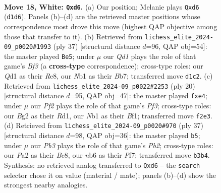 \documentclass[11pt]{article}
\begin{document}
\clearpage

\begin{figure}[p]\centering
\begin{subfigure}{0.46\textwidth}\centering
\resizebox{\linewidth}{!}{%
\newchessgame
\chessboard[
  setfen={rnbr2k1/1p2bpp1/pn1qp3/7p/8/1Pp1p1P1/P3PPBP/RNBQRK2 w - - 0 18},
  showmover=false,
  pgfstyle=straightmove, color=movearrow, markmove={d1-d6}
]}
\caption{}
\end{subfigure}\hfill
\begin{subfigure}{0.46\textwidth}\centering
\resizebox{\linewidth}{!}{%
\newchessgame
\chessboard[
  setfen={r3r1k1/1bqn1p1p/p2p1bp1/1p1P4/2P1N2P/1P6/2B2PP1/1RBQR1K1 b - - 4 19},
  showmover=false,
  pgfstyle=straightmove, color=movearrow, markmove={f6-e5}
]}
\caption{}
\end{subfigure}
\\[4pt]
\begin{subfigure}{0.46\textwidth}\centering
\resizebox{\linewidth}{!}{%
\newchessgame
\chessboard[
  setfen={rnbq1rk1/pp3pb1/2p2npp/8/3Pp2B/2N2P2/PPQ3PP/2KR1BNR w - - 0 11},
  showmover=false,
  pgfstyle=straightmove, color=movearrow, markmove={f3-e4}
]}
\caption{}
\end{subfigure}\hfill
\begin{subfigure}{0.46\textwidth}\centering
\resizebox{\linewidth}{!}{%
\newchessgame
\chessboard[
  setfen={r1b2rk1/1pp2pbp/6p1/2q5/p1nN2P1/P1Q1B3/BPP2P1P/2KR2R1 b - - 5 19},
  showmover=false,
  pgfstyle=straightmove, color=movearrow, markmove={b7-b5}
]}
\caption{}
\end{subfigure}
\caption{\textbf{Move 18, White: \texttt{Qxd6}.} (a) Our position; Melanie plays \texttt{Qxd6} (\texttt{d1d6}). Panels (b)--(d) are the retrieved master positions whose correspondence most drove this move (highest QAP objective among those that transfer to it). (b) Retrieved from \texttt{lichess\_elite\_2024-09\_p0020\#1993} (ply 37) [structural distance $d$=96, QAP obj=54]: the master played \texttt{Be5}; under $\mu$ our \emph{Qd1} plays the role of that game's \emph{Bf3} (a \textbf{cross-type} correspondence); cross-type roles: our \emph{Q}d1 as their \emph{R}e8, our \emph{N}b1 as their \emph{B}b7; transferred move \texttt{d1c2}. (c) Retrieved from \texttt{lichess\_elite\_2024-09\_p0022\#2253} (ply 20) [structural distance $d$=95, QAP obj=47]: the master played \texttt{fxe4}; under $\mu$ our \emph{Pf2} plays the role of that game's \emph{Pf3}; cross-type roles: our \emph{B}g2 as their \emph{R}d1, our \emph{N}b1 as their \emph{B}f1; transferred move \texttt{f2e3}. (d) Retrieved from \texttt{lichess\_elite\_2024-09\_p0020\#970} (ply 37) [structural distance $d$=98, QAP obj=36]: the master played \texttt{b5}; under $\mu$ our \emph{Pb3} plays the role of that game's \emph{Pb2}; cross-type roles: our \emph{P}a2 as their \emph{B}c8, our \emph{n}b6 as their \emph{P}f7; transferred move \texttt{b3b4}. Synthesis: no retrieved analog transferred to \texttt{Qxd6} -- the \texttt{search} selector chose it on value (material / mate); panels (b)--(d) show the strongest nearby analogies.}
\label{fig:thought-m34}
\end{figure}
\end{document}

